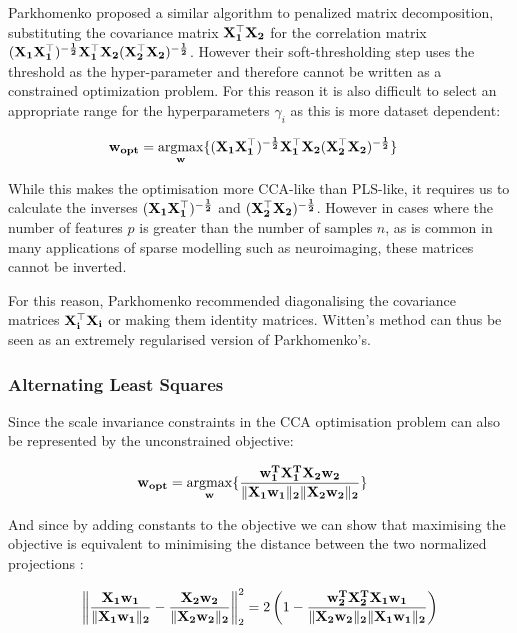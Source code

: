 Parkhomenko proposed a similar algorithm to penalized matrix decomposition, substituting the covariance matrix $\bold{X_1^{\top}X_2}$ for the correlation matrix $\bold{(X_1X_1^{\top})^{-\frac{1}{2}}X_1^{\top}X_2(X_2^{\top}X_2)^{-\frac{1}{2}}}$\cite{parkhomenko2009sparse}. However their soft-thresholding step uses the threshold as the hyper-parameter and therefore cannot be written as a constrained optimization problem. For this reason it is also difficult to select an appropriate range for the hyperparameters $\gamma_i$ as this is more dataset dependent:

\begin{align}
    \label{eq:parkho}
    & \bold{w_{opt}}=\underset{\bold{w}}{\mathrm{argmax}}\{ \bold{(X_1X_1^{\top})^{-\frac{1}{2}}X_1^{\top}X_2(X_2^{\top}X_2)^{-\frac{1}{2}}} \}
\end{align}

While this makes the optimisation more CCA-like than PLS-like, it requires us to calculate the inverses $\bold{(X_1X_1^{\top})^{-\frac{1}{2}}}$ and $\bold{(X_2^{\top}X_2)^{-\frac{1}{2}}}$. However in cases where the number of features $p$ is greater than the number of samples $n$, as is common in many applications of sparse modelling such as neuroimaging, these matrices cannot be inverted.

For this reason, Parkhomenko recommended diagonalising the covariance matrices $\bold{X_i^{\top}X_i}$ or making them identity matrices. Witten's method can thus be seen as an extremely regularised version of Parkhomenko's.

\subsubsection{Alternating Least Squares}\label{sec:ALS}

Since the scale invariance constraints in the CCA optimisation problem can also be represented by the unconstrained objective:

\begin{align}
    & \bold{w_{opt}}=\underset{\bold{w}}{\mathrm{argmax}}\{\bold{\frac{\bold{w_1^{T}X_1^{T}X_2w_2}}{\|\bold{X_1w_1}\|_{2}\|\bold{X_2w_2}\|_{2}}}\}
\end{align}

And since by adding constants to the objective we can show that maximising the objective is equivalent to minimising the distance between the two normalized projections \cite{golub1995canonical}:

\begin{align}
    \left\|\bold{\frac{X_1 w_1}{\|X_1 w_1\|_{2}}-\frac{X_2 w_2}{\|X_2 w_2\|_{2}}}\right\|_{2}^{2}=2\left(1-\bold{\frac{w_2^{T} X_2^{T} X_1 w_1}{\|X_2 w_2\|_{2}\|X_1 w_1\|_{2}}}\right)
\end{align}

